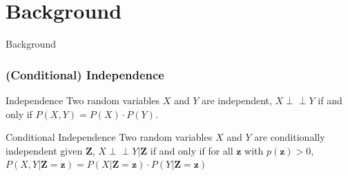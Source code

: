 \documentclass{beamer}
\def\ci{\perp\!\!\!\!\!\perp}
\begin{document}
\section{Background}
\begin{frame}
	\begin{center} \Huge{Background} \end{center}
\end{frame}
\begin{frame}
	\frametitle{(Conditional) Independence}
	\begin{block}{Independence}
		Two random variables $ X $ and $ Y $ are independent,
		$ X \ci Y $ if and only if $ P(X, Y) = P(X) \cdot P(Y) $.
	\end{block}
	\vspace{1em}

	\begin{block}{Conditional Independence}
		Two random variables $ X $ and $ Y $ are conditionally
		independent given $ \bm{Z} $, $ X \ci Y | \bm{Z} $ if and only
		if for all $ \bm{z} $ with $ p(\bm{z}) > 0 $, $ P(X, Y |
		\bm{Z}=\bm{z}) = P(X | \bm{Z}=\bm{z}) \cdot P(Y |
		\bm{Z}=\bm{z}) $
	\end{block}
\end{frame}
\end{document}
